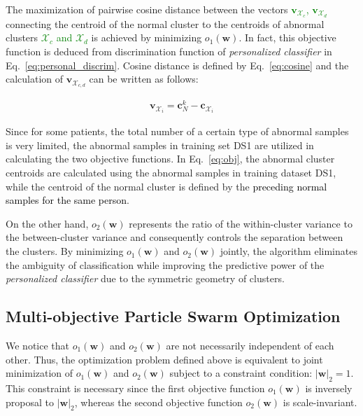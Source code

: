The maximization of pairwise cosine distance between the vectors \textcolor{green}{$\mathbf{v}_{\mathcal{X}_{c}}$, $\mathbf{v}_{\mathcal{X}_{d}}$} connecting the centroid of the normal cluster to the centroids of abnormal clusters \textcolor{green}{$\mathcal{X}_c$ and $\mathcal{X}_d$} is achieved by minimizing $o_1(\mathbf{w})$. In fact, this objective function is deduced from discrimination function of \textit{personalized classifier} in Eq.~\ref{eq:personal_discrim}. Cosine distance is defined by Eq.~\ref{eq:cosine} and the calculation of $\mathbf{v}_{\mathcal{X}_{c,d}}$ can be written as follows: %

\begin{align}
\mathbf{v}_{\mathcal{X}_i} = \mathbf{c}^k_N -  \mathbf{c}_{\mathcal{X}_i}
\end{align}

Since for some patients, the total number of a certain type of abnormal samples is very limited, the abnormal samples in training set DS1 are utilized in calculating the two objective functions. In Eq.~\ref{eq:obj}, the abnormal cluster centroids are calculated using the abnormal samples in training dataset DS1, while the centroid of the normal cluster is defined by the \textcolor{black}{preceding normal samples for the same person}. %

On the other hand, $o_2(\mathbf{w})$ represents the ratio of the within-cluster variance to the between-cluster variance and consequently controls the separation between the clusters. By minimizing $o_1(\mathbf{w})$ and $o_2(\mathbf{w})$ jointly, the algorithm eliminates the ambiguity of classification while %
improving the predictive power of the \textit{personalized classifier} due to the symmetric geometry of clusters. 

\subsection{Multi-objective Particle Swarm Optimization}

We notice that $o_1(\mathbf{w}) $ and $o_2(\mathbf{w})$ are not necessarily independent of each other. Thus, the optimization problem defined above is equivalent to joint minimization of $o_1(\mathbf{w}) $ and $o_2(\mathbf{w})$ subject to a constraint condition: $|\mathbf{w}|_2=1$. This constraint is necessary since the first objective function $o_1(\mathbf{w})$ is inversely proposal to $|\mathbf{w}|_2$, whereas the second objective function $o_2(\mathbf{w})$ is scale-invariant. 

